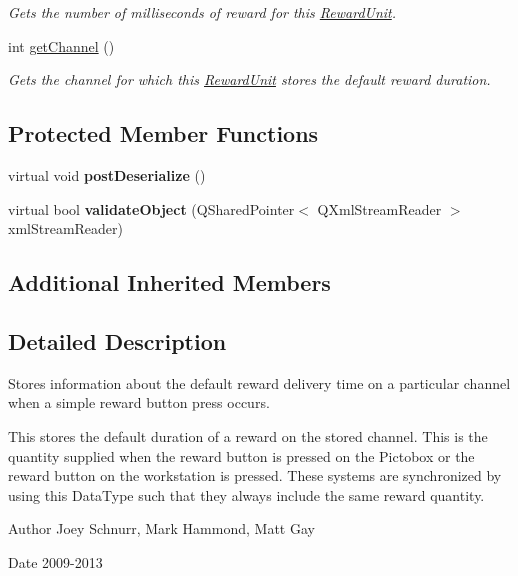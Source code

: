 \begin{DoxyCompactItemize}
\begin{DoxyCompactList}\small\item\em Gets the number of milliseconds of reward for this \hyperlink{class_picto_1_1_reward_unit}{Reward\-Unit}. \end{DoxyCompactList}\item 
\hypertarget{class_picto_1_1_reward_unit_a17ea687b64e2838f6ca0d7944b2f713c}{int \hyperlink{class_picto_1_1_reward_unit_a17ea687b64e2838f6ca0d7944b2f713c}{get\-Channel} ()}\label{class_picto_1_1_reward_unit_a17ea687b64e2838f6ca0d7944b2f713c}

\begin{DoxyCompactList}\small\item\em Gets the channel for which this \hyperlink{class_picto_1_1_reward_unit}{Reward\-Unit} stores the default reward duration. \end{DoxyCompactList}\end{DoxyCompactItemize}
\subsection*{Protected Member Functions}
\begin{DoxyCompactItemize}
\item 
\hypertarget{class_picto_1_1_reward_unit_ab9c51fc1295e0303e669cd586827142d}{virtual void {\bfseries post\-Deserialize} ()}\label{class_picto_1_1_reward_unit_ab9c51fc1295e0303e669cd586827142d}

\item 
\hypertarget{class_picto_1_1_reward_unit_ac46615f6e3dceef4af7c9c700ef6b852}{virtual bool {\bfseries validate\-Object} (Q\-Shared\-Pointer$<$ Q\-Xml\-Stream\-Reader $>$ xml\-Stream\-Reader)}\label{class_picto_1_1_reward_unit_ac46615f6e3dceef4af7c9c700ef6b852}

\end{DoxyCompactItemize}
\subsection*{Additional Inherited Members}


\subsection{Detailed Description}
Stores information about the default reward delivery time on a particular channel when a simple reward button press occurs. 

This stores the default duration of a reward on the stored channel. This is the quantity supplied when the reward button is pressed on the Pictobox or the reward button on the workstation is pressed. These systems are synchronized by using this Data\-Type such that they always include the same reward quantity. \begin{DoxyAuthor}{Author}
Joey Schnurr, Mark Hammond, Matt Gay 
\end{DoxyAuthor}
\begin{DoxyDate}{Date}
2009-\/2013 
\end{DoxyDate}



